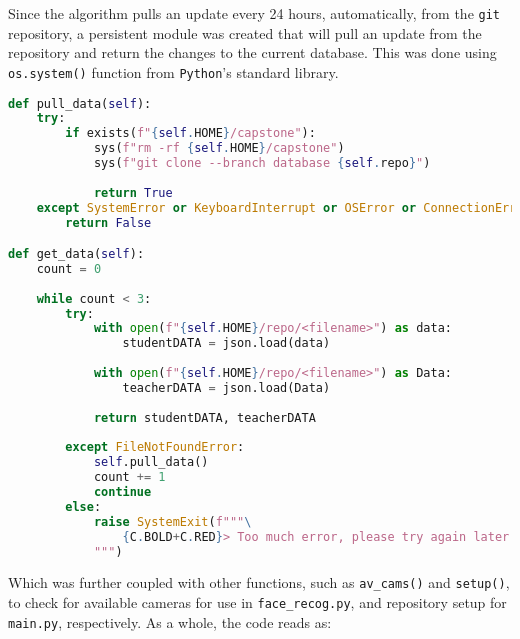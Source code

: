 \documentclass[12pt]{article}
\begin{document}
Since the algorithm pulls an update every 24 hours, automatically, from the \texttt{git} repository, a persistent module was created that will pull an update from the repository and return the changes to the current database. This was done using \texttt{os.system()} function from \texttt{Python}'s standard library.

\singlespacing
\begin{lstlisting}[language=Python, caption={Python algorithm for the \texttt{systemd} service to be used to pull a git update on repository.}]
def pull_data(self):
	try:
		if exists(f"{self.HOME}/capstone"):
			sys(f"rm -rf {self.HOME}/capstone")
			sys(f"git clone --branch database {self.repo}")
			
			return True
	except SystemError or KeyboardInterrupt or OSError or ConnectionError:
		return False

def get_data(self):
	count = 0
	
	while count < 3:
		try:
			with open(f"{self.HOME}/repo/<filename>") as data:
				studentDATA = json.load(data)
			
			with open(f"{self.HOME}/repo/<filename>") as Data:
				teacherDATA = json.load(Data)
			
			return studentDATA, teacherDATA
		
		except FileNotFoundError:
			self.pull_data()
			count += 1
			continue
		else:
			raise SystemExit(f"""\
				{C.BOLD+C.RED}> Too much error, please try again later.{C.END}
			""")

\end{lstlisting}
\doublespacing

Which was further coupled with other functions, such as \texttt{av\_cams()} and \texttt{setup()}, to check for available cameras for use in \texttt{face\_recog.py}, and repository setup for \texttt{main.py}, respectively. As a whole, the code reads as:
\end{document}
